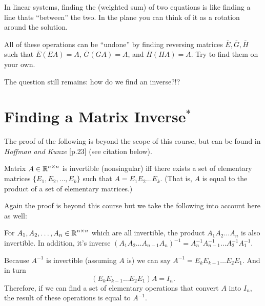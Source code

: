\begin{aside}
In linear systems, finding the (weighted sum) of two equations is like finding a line thats ``between'' the two. 
In the plane you can think of it as a rotation around the solution. 
\end{aside}

All of these operations can be ``undone'' by finding reversing matrices $\overline{E},\overline{G},\overline{H}$ such that 
$\overline{E}(EA)=A$, $\overline{G}(GA)=A$, and $\overline{H}(HA)=A$. 
Try to find them on your own.  

The question still remains: 
how do we find an inverse?!?

\section{Finding a Matrix Inverse$^*$}
The proof of the following is beyond the scope of this course, but can be found in \textit{Hoffman and Kunze} [p.23] (see citation below). 

\begin{tcolorbox}
Matrix $A\in\operatorname{\mathbb{R}}^{n\times n}$ is invertible (nonsingular) iff 
there exists a set of elementary matrices $\{E_1, E_2, \hdots, E_k\}$ 
such that $A =  E_1E_2\hdots E_k$.
(That is, $A$ is equal to the product of a set of elementary matrices.)
\end{tcolorbox}

Again the proof is beyond this course but we take the following into account here as well: 
\begin{tcolorbox}
For $A_1, A_2, \hdots, A_n\in\operatorname{\mathbb{R}}^{n\times n}$ which are all invertible, 
the product $A_1A_2\hdots A_n$ is also invertible. 
In addition, it's inverse $\left(A_1A_2\hdots A_{n-1}A_n\right)^{-1} = A_n^{-1}A_{n-1}^{-1}\hdots A_2^{-1}A_1^{-1}$.
\end{tcolorbox}

Because $A^{-1}$ is invertible (assuming $A$ is) we can say $A^{-1} = E_kE_{k-1}\hdots E_2E_1$.
And in turn \[(E_kE_{k-1}\hdots E_2E_1)A = I_n.\] 
Therefore, if we can find a set of elementary operations that convert $A$ into $I_n$, 
the result of these operations is equal to $A^{-1}$. 

